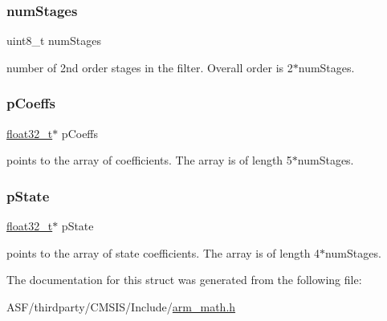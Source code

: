 \subsubsection{\texorpdfstring{numStages}{numStages}}
{\footnotesize\ttfamily uint8\+\_\+t num\+Stages}

number of 2nd order stages in the filter. Overall order is 2$\ast$num\+Stages. \mbox{\label{structarm__biquad__cascade__stereo__df2_t__instance__f32_aacbb8dd8eeba4b21fc2bb40076405ee3}} 
\subsubsection{\texorpdfstring{pCoeffs}{pCoeffs}}
{\footnotesize\ttfamily \mbox{\hyperlink{arm__math_8h_a4611b605e45ab401f02cab15c5e38715}{float32\+\_\+t}}$\ast$ p\+Coeffs}

points to the array of coefficients. The array is of length 5$\ast$num\+Stages. \mbox{\label{structarm__biquad__cascade__stereo__df2_t__instance__f32_a335c87e6fdc4b96601d95a5de8b9c463}} 
\subsubsection{\texorpdfstring{pState}{pState}}
{\footnotesize\ttfamily \mbox{\hyperlink{arm__math_8h_a4611b605e45ab401f02cab15c5e38715}{float32\+\_\+t}}$\ast$ p\+State}

points to the array of state coefficients. The array is of length 4$\ast$num\+Stages. 

The documentation for this struct was generated from the following file\+:\begin{DoxyCompactItemize}
\item 
A\+S\+F/thirdparty/\+C\+M\+S\+I\+S/\+Include/\mbox{\hyperlink{arm__math_8h}{arm\+\_\+math.\+h}}\end{DoxyCompactItemize}
